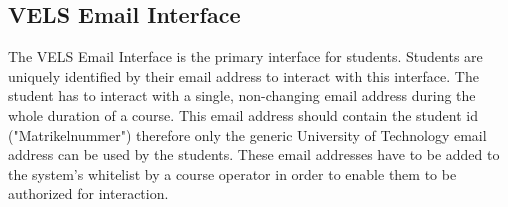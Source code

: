 \newpage

\subsection{VELS Email Interface}\label{emailinterface}
The VELS Email Interface is the primary interface for students. Students are uniquely identified by their email 
address to interact with this interface. The student has to interact with a single, non-changing email address
during the whole duration of a course. This email address should contain the student id ("Matrikelnummer")
therefore only
the generic University of Technology email address can be used by the students. These email addresses have to be added to the system's whitelist by a course operator in order to enable them to be authorized for interaction.

